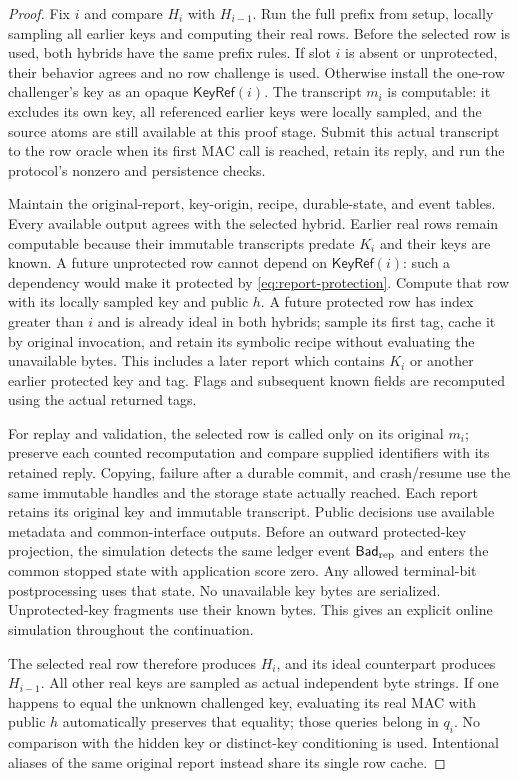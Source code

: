 \begin{proof}
Fix $i$ and compare $H_i$ with $H_{i-1}$.  Run the full prefix from setup,
locally sampling all earlier keys and computing their real rows.  Before the
selected row is used, both hybrids have the same prefix rules.  If slot $i$
is absent or unprotected, their behavior agrees and no row challenge is used.
Otherwise install the one-row challenger's key as an opaque
$\mathsf{KeyRef}(i)$.  The transcript $m_i$ is computable: it excludes its own
key, all referenced earlier keys were locally sampled, and the source atoms
are still available at this proof stage.  Submit this actual transcript to
the row oracle when its first MAC call is reached, retain its reply, and run
the protocol's nonzero and persistence checks.

Maintain the original-report, key-origin, recipe, durable-state, and event
tables.  Every available output agrees with the selected hybrid.  Earlier
real rows remain computable because their immutable transcripts predate
$K_i$ and their keys are known.  A future unprotected row cannot depend on
$\mathsf{KeyRef}(i)$: such a dependency would make it protected by
\eqref{eq:report-protection}.  Compute that row with its locally sampled key
and public $h$.  A future protected row has index greater than $i$ and is
already ideal in both hybrids; sample its first tag, cache it by original
invocation, and retain its symbolic recipe without evaluating the unavailable
bytes.  This includes a later report which contains $K_i$ or another earlier
protected key and tag.  Flags and subsequent known fields are recomputed
using the actual returned tags.

For replay and validation, the selected row is called only on its original
$m_i$; preserve each counted recomputation and compare supplied identifiers
with its retained reply.  Copying, failure after a durable commit, and
crash/resume use the same immutable handles and the storage state actually
reached. Each report retains its original key and immutable transcript.
Public decisions use available metadata and common-interface outputs.
Before an outward protected-key projection, the simulation detects the same
ledger event $\mathsf{Bad}_{\rm rep}$ and enters the common stopped state
with application score zero. Any allowed terminal-bit postprocessing uses
that state. No unavailable key bytes are serialized. Unprotected-key
fragments use their known bytes.
This gives an explicit online simulation throughout the continuation.

The selected real row therefore produces $H_i$, and its ideal counterpart
produces $H_{i-1}$.  All other real keys are sampled as actual independent byte
strings.  If one happens to equal the unknown challenged key, evaluating its
real MAC with public $h$ automatically preserves that equality; those queries
belong in $q_i$.  No comparison with the hidden key or distinct-key conditioning
is used.  Intentional aliases of the same original report instead share its
single row cache.


\end{proof}
